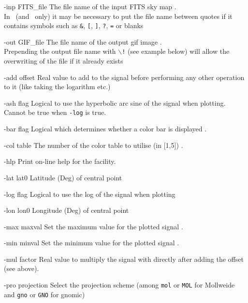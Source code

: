 \begin{qualifiers}
  \begin{qulist}{} %
    \item[{-inp FITS\_file}] The file name of the input FITS sky map \nodefault.\\
In \thedocid\ (and \thedocid\ only) it may be necessary to put the file name between quotes if it contains symbols
such as \texttt{\&}, \texttt{[}, \texttt{]}, \texttt{?}, \texttt{=}  or blanks
    \item[{-out GIF\_file}] The file name of the output gif image \nodefault.\\
Prepending the output file name with \texttt{$\backslash$!} (see example below) will allow the overwriting of the
file if it already exists
    \item[{-add offset}] Real value to add to the signal before performing any
      other operation to it (like taking the logarithm etc.)
    \item[{-ash flag}] Logical to use the hyperbolic arc sine of the signal when
      plotting. Cannot be true when \texttt{-log} is true.
    \item[{-bar flag}] Logical which determines whether a color bar is
      displayed . 
    \item[{-col table}] The number of the color table to utilise (in [1,5]) .
    \item[{-hlp}] Print on-line help for the facility.
    \item[{-lat lat0}] Latitude (Deg) of central point 
    \item[{-log flag}] Logical to use the log of the signal when plotting 
    \item[{-lon lon0}] Longitude (Deg) of central point 
    \item[{-max maxval}] Set the maximum value for the plotted signal
      .
    \item[{-min minval}] Set the minimum value for the plotted signal
     .
    \item[{-mul factor}] Real value to multiply the signal with directly after
      adding the offset (see above).
    \item[{-pro projection}] Select the projection scheme 
	(among \texttt{mol} or \texttt{MOL} for Mollweide and \texttt{gno} or \texttt{GNO} for gnomic)

\end{qulist}
\end{qualifiers}
